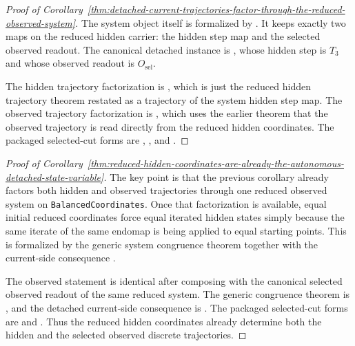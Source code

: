 \begin{proof}[Proof of Corollary~\ref{thm:detached-current-trajectories-factor-through-the-reduced-observed-system}]
\label{proof:thm:detached-current-trajectories-factor-through-the-reduced-observed-system}
The system object itself is formalized by
. It keeps exactly two maps on the
reduced hidden carrier: the hidden step map and the selected observed readout.
The canonical detached instance is
, whose hidden
step is \(T_3\) and whose observed readout is \(O_{\mathrm{sel}}\).

The hidden trajectory factorization is
, which is just
the reduced hidden trajectory theorem restated as a trajectory of the system
hidden step map. The observed trajectory factorization is
, which uses
the earlier theorem that the observed trajectory is read directly from the
reduced hidden coordinates. The packaged selected-cut forms are
,
,
and
.
\end{proof}

\begin{proof}[Proof of Corollary~\ref{thm:reduced-hidden-coordinates-are-already-the-autonomous-detached-state-variable}]
\label{proof:thm:reduced-hidden-coordinates-are-already-the-autonomous-detached-state-variable}
The key point is that the previous corollary already factors both hidden and
observed trajectories through one reduced observed system on
\texttt{BalancedCoordinates}. Once that factorization is available, equal
initial reduced coordinates force equal iterated hidden states simply because
the same iterate of the same endomap is being applied to equal starting points.
This is formalized by the generic system congruence theorem
 together with
the current-side consequence
.

The observed statement is identical after composing with the canonical selected
observed readout of the same reduced system. The generic congruence theorem is
, and the
detached current-side consequence is
.
The packaged selected-cut forms are
and
.
Thus the reduced hidden coordinates already determine both the hidden and the
selected observed discrete trajectories.
\end{proof}

